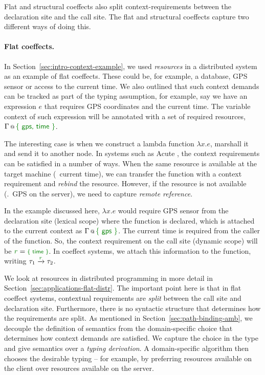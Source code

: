Flat and structural coeffects also split context-requirements between the declaration site and
the call site. The flat and structural coeffects capture two different ways of doing this.

\paragraph{Flat coeffects.}

In Section~\ref{sec:intro-context-example}, we used \emph{resources} in a distributed system as an
example of flat coeffects. These could be, for example, a database, GPS sensor or access to the current
time. We also outlined that such context demands can be tracked as part of the typing assumption,
for example, say we have an expression $e$ that requires GPS coordinates and the current time.
The variable context of such expression will be annotated with a set of required resources,
\ie~$\coctx{\Gamma}{ \cclrd{\ident{\{ gps, time \}}} }$.

The interesting case is when we construct a lambda function $\lambda x.e$, marshall it and
send it to another node. In systems such as Acute \cite{app-distributed-acute}, the context
requirements can be satisfied in a number of ways. When the same resource is available at the target
machine (\eg~current time), we can transfer the function with a context requirement and \emph{rebind}
the resource. However, if the resource is not available (\eg.~GPS on the server), we need to 
capture \emph{remote reference}.

In the example discussed here, $\lambda x.e$ would require GPS sensor from the declaration
site (lexical scope) where the function is declared, which is attached to the current context
as $\coctx{\Gamma}{ \cclrd{\ident{\{ gps \}}} }$. The current time is required from the caller
of the function. So, the context requirement on the call site (dynamic scope) will be
$\cclrd{r}=\cclrd{\footnotesize\ident{\{ time \}}}$. In coeffect systems, we attach this information
to the function, writing $\tau_1 \xrightarrow{ \cclrd{r} } \tau_2$.

We look at resources in distributed programming in more detail in Section~\ref{sec:applications-flat-distr}.
The important point here is that in flat coeffect systems, contextual requirements are
\emph{split} between the call site and declaration site. Furthermore, there is no syntactic
structure that determines how the requirements are split. As mentioned in Section~\ref{sec:path-binding-amb},
we decouple the definition of semantics from the domain-specific choice that determines how
context demands are satisfied. We capture the choice in the type and give semantics over a
\emph{typing derivation}. A domain-specific algorithm then chooses the desirable typing -- for
example, by preferring resources available on the client over resources available on the server.


